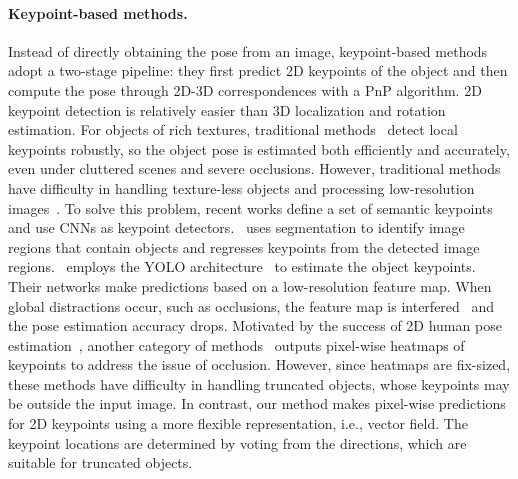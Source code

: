 \documentclass[10pt,twocolumn,letterpaper]{article}
\begin{document}
\paragraph{Keypoint-based methods.} Instead of directly obtaining the pose from an image, keypoint-based methods adopt a two-stage pipeline: they first predict 2D keypoints of the object and then compute the pose through 2D-3D correspondences with a PnP algorithm. 2D keypoint detection is relatively easier than 3D localization and rotation estimation. For objects of rich textures, traditional methods~\cite{lowe1999object, rothganger20063d, bay2006surf} detect local keypoints robustly, so the object pose is estimated both efficiently and accurately, even under cluttered scenes and severe occlusions. However, traditional methods have difficulty in handling texture-less objects and processing low-resolution images~\cite{lepetit2005monocular}. To solve this problem, recent works define a set of semantic keypoints and use CNNs as keypoint detectors.~\cite{rad2017bb8} uses segmentation to identify image regions that contain objects and regresses keypoints from the detected image regions.~\cite{tekin2018real} employs the YOLO architecture~\cite{redmon2017yolo9000} to estimate the object keypoints. Their networks make predictions based on a low-resolution feature map. When global distractions occur, such as occlusions, the feature map is interfered~\cite{oberweger2018making} and the pose estimation accuracy drops. Motivated by the success of 2D human pose estimation~\cite{newell2016stacked}, another category of methods~\cite{pavlakos20176, oberweger2018making} outputs pixel-wise heatmaps of keypoints to address the issue of occlusion. However, since heatmaps are fix-sized, these methods have difficulty in handling truncated objects, whose keypoints may be outside the input image. In contrast, our method makes pixel-wise predictions for 2D keypoints using a more flexible representation, i.e., vector field. The keypoint locations are determined by voting from the directions, which are suitable for truncated objects.
\end{document}
